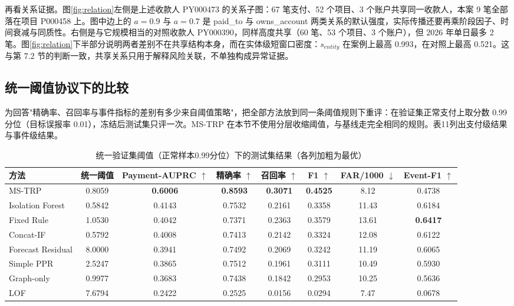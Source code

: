 \documentclass[twocolumn,11pt]{ctexart}
\begin{document}
再看关系证据。图\ref{fig:relation}左侧是上述收款人 PY000473 的关系子图：67 笔支付、52 个项目、3 个账户共享同一收款人，本案 9 笔全部落在项目 P000458 上。图中边上的 $a=0.9$ 与 $a=0.7$ 是 paid\_to 与 owns\_account 两类关系的默认强度，实际传播还要再乘阶段因子、时间衰减与同质性。右侧是与它规模相当的对照收款人 PY000390，同样高度共享（60 笔、53 个项目、3 个账户），但 2026 年单日最多 2 笔。图\ref{fig:relation}下半部分说明两者差别不在共享结构本身，而在实体级短窗口密度：$s_{entity}$ 在案例上最高 0.993，在对照上最高 0.521。这与第 7.2 节的判断一致，共享关系只用于解释风险关联，不单独构成异常证据。


\subsection{统一阈值协议下的比较}
为回答"精确率、召回率与事件指标的差别有多少来自阈值策略"，把全部方法放到同一条阈值规则下重评：在验证集正常支付上取分数 0.99 分位（目标误报率 0.01），冻结后测试集只评一次。MS-TRP 在本节不使用分层收缩阈值，与基线走完全相同的规则。表11列出支付级结果与事件级结果。

\begin{table}[t]
\centering\small
\caption{统一验证集阈值（正常样本0.99分位）下的测试集结果（各列加粗为最优）}
\begin{tabular}{lccccccc}
\toprule
方法 & 统一阈值 & Payment-AUPRC $\uparrow$ & 精确率 $\uparrow$ & 召回率 $\uparrow$ & F1 $\uparrow$ & FAR/1000 $\downarrow$ & Event-F1 $\uparrow$ \\
\midrule
MS-TRP & 0.8059 & \textbf{0.6006} & \textbf{0.8593} & \textbf{0.3071} & \textbf{0.4525} & 8.12 & 0.4738 \\
Isolation Forest & 0.5842 & 0.4143 & 0.7532 & 0.2161 & 0.3358 & 11.43 & 0.6184 \\
Fixed Rule & 1.0530 & 0.4042 & 0.7371 & 0.2363 & 0.3579 & 13.61 & \textbf{0.6417} \\
Concat-IF & 0.5792 & 0.4008 & 0.7413 & 0.2142 & 0.3324 & 12.08 & 0.6122 \\
Forecast Residual & 8.0000 & 0.3941 & 0.7492 & 0.2069 & 0.3242 & 11.19 & 0.6065 \\
Simple PPR & 2.5247 & 0.3865 & 0.7512 & 0.1961 & 0.3111 & 10.49 & 0.5930 \\
Graph-only & 0.9977 & 0.3683 & 0.7438 & 0.1842 & 0.2953 & 10.25 & 0.5636 \\
LOF & 7.6794 & 0.2422 & 0.2525 & 0.0156 & 0.0294 & 7.47 & 0.0678 \\
\bottomrule
\end{tabular}
\end{table}
\end{document}
